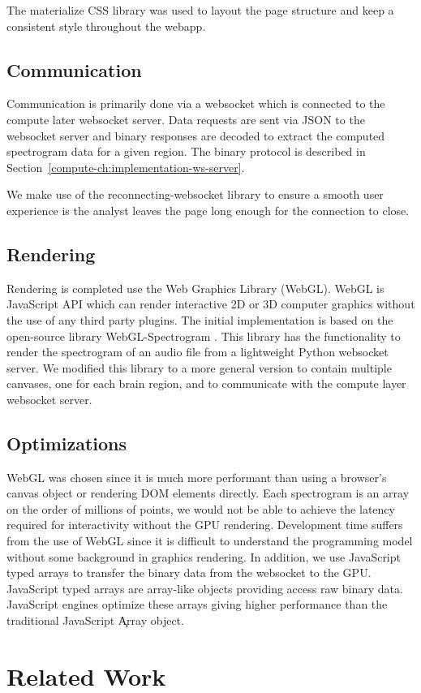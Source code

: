 The materialize CSS library \cite{materialize} was used to layout the page
structure and keep a consistent style throughout the webapp.

\subsection{Communication}

Communication is primarily done via a websocket which is connected to the
compute later websocket server. Data requests are sent via JSON to the
websocket server and binary responses are decoded to extract the computed
spectrogram data for a given region. The binary protocol is described in
Section~\ref{compute-ch:implementation-ws-server}.

We make use of the reconnecting-websocket \cite{reconnecting-websocket} library
to ensure a smooth user experience is the analyst leaves the page long enough
for the connection to close.

\subsection{Rendering}

Rendering is completed use the Web Graphics Library (WebGL). WebGL is
JavaScript API which can render interactive 2D or 3D computer graphics without
the use of any third party plugins. The initial implementation is based on the
open-source library WebGL-Spectrogram \cite{webgl-spectrogram}. This library
has the functionality to render the spectrogram of an audio file from a
lightweight Python websocket server. We modified this library to a more general
version to contain multiple canvases, one for each brain region, and to
communicate with the compute layer websocket server. \\

\subsection{Optimizations}

WebGL was chosen since it is much more performant than using a browser's canvas
object or rendering DOM elements directly. Each spectrogram is an array on the
order of millions of points, we would not be able to achieve the latency
required for interactivity without the GPU rendering. Development time suffers
from the use of WebGL since it is difficult to understand the programming model
without some background in graphics rendering. In addition, we use JavaScript
typed arrays to transfer the binary data from the websocket to the GPU.
JavaScript typed arrays are array-like objects providing access raw binary
data. JavaScript engines optimize these arrays giving higher performance than
the traditional JavaScript \c{Array} object.

\section{Related Work}

